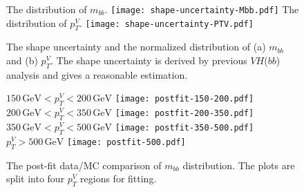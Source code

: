 \documentclass[class=NTHU_thesis, crop=false]{standalone}
\begin{document}
\begin{figure}[!hbt]
	\centering
	\subcaptionbox
	{The distribution of $m_{bb}$.
		\label{fig:shape-uncertainty-fig1}}
		{\texttt{[image: shape-uncertainty-Mbb.pdf]}}
	\vspace{\baselineskip}
	\subcaptionbox
	{The distribution of $p^V_T$.
		\label{fig:shape-uncertainty-fig2}}
		{\texttt{[image: shape-uncertainty-PTV.pdf]}}
	\caption{The shape uncertainty and the normalized distribution of (a) $m_{bb}$ and (b) $p^V_T$. The shape uncertainty is derived by previous $VH$($bb$) analysis and gives a reasonable estimation.}
	\label{fig:shape-uncertainty}
\end{figure}

\begin{figure}[!hbt]
	\captionsetup[subfigure]{labelformat=empty}
	\centering
	\subcaptionbox
	{$150\, \mathrm{GeV} < p^V_T < 200\, \mathrm{GeV}$
		\label{fig:2-lep-postfit-fig1}}
		{\texttt{[image: postfit-150-200.pdf]}}
	\subcaptionbox
	{$200\, \mathrm{GeV} < p^V_T < 350\, \mathrm{GeV}$
		\label{fig:2-lep-postfit-fig2}}
		{\texttt{[image: postfit-200-350.pdf]}}
	\vspace{\baselineskip}
	\subcaptionbox
	{$350\, \mathrm{GeV} < p^V_T < 500\, \mathrm{GeV}$
		\label{fig:2-lep-postfit-fig3}}
		{\texttt{[image: postfit-350-500.pdf]}}
	\subcaptionbox
	{$p^V_T > 500\, \mathrm{GeV}$
		\label{fig:2-lep-postfit-fig4}}
		{\texttt{[image: postfit-500.pdf]}}
	\caption{The post-fit data/MC comparison of $m_{bb}$ distribution. The plots are split into four $p^V_T$ regions for fitting.}
	\label{fig:2-lep-postfit}
\end{figure}
\end{document}
